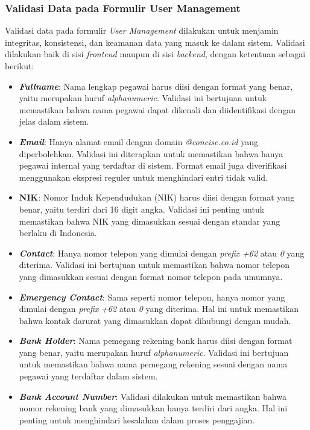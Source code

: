 \subsubsection{Validasi Data pada Formulir User Management}
Validasi data pada formulir \textit{User Management} dilakukan untuk menjamin integritas, konsistensi, dan keamanan data yang masuk ke dalam sistem. Validasi dilakukan baik di sisi \textit{frontend} maupun di sisi \textit{backend}, dengan ketentuan sebagai berikut:

\begin{itemize}
    \item \textbf{\textit{Fullname}}: Nama lengkap pegawai harus diisi dengan format yang benar, yaitu merupakan huruf \textit{alphanumeric}. Validasi ini bertujuan untuk memastikan bahwa nama pegawai dapat dikenali dan diidentifikasi dengan jelas dalam sistem.
    \item \textbf{\textit{Email}}: Hanya alamat email dengan domain \textit{@concise.co.id} yang diperbolehkan. Validasi ini diterapkan untuk memastikan bahwa hanya pegawai internal yang terdaftar di sistem. Format email juga diverifikasi menggunakan ekspresi reguler untuk menghindari entri tidak valid.
    \item \textbf{NIK}: Nomor Induk Kependudukan (NIK) harus diisi dengan format yang benar, yaitu terdiri dari 16 digit angka. Validasi ini penting untuk memastikan bahwa NIK yang dimasukkan sesuai dengan standar yang berlaku di Indonesia.
    \item \textbf{\textit{Contact}}: Hanya nomor telepon yang dimulai dengan \textit{prefix} \textit{+62} atau \textit{0} yang diterima. Validasi ini bertujuan untuk memastikan bahwa nomor telepon yang dimasukkan sesuai dengan format nomor telepon pada umumnya.
    \item \textbf{\textit{Emergency Contact}}: Sama seperti nomor telepon, hanya nomor yang dimulai dengan \textit{prefix} \textit{+62} atau \textit{0} yang diterima. Hal ini untuk memastikan bahwa kontak darurat yang dimasukkan dapat dihubungi dengan mudah.
    \item \textbf{\textit{Bank Holder}}: Nama pemegang rekening bank harus diisi dengan format yang benar, yaitu merupakan huruf \textit{alphanumeric}. Validasi ini bertujuan untuk memastikan bahwa nama pemegang rekening sesuai dengan nama pegawai yang terdaftar dalam sistem.
    \item \textbf{\textit{Bank Account Number}}: Validasi dilakukan untuk memastikan bahwa nomor rekening bank yang dimasukkan hanya terdiri dari angka. Hal ini penting untuk menghindari kesalahan dalam proses penggajian.
\end{itemize}

